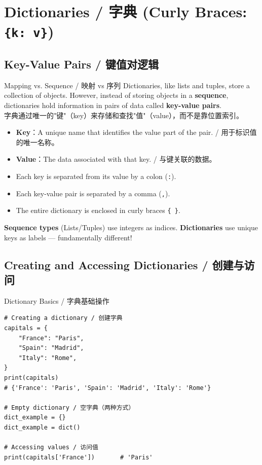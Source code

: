 \documentclass[11pt,a4paper]{article}
\begin{document}
\section{Dictionaries / 字典 (Curly Braces: \texttt{\{k: v\}})}

\subsection{Key-Value Pairs / 键值对逻辑}

\begin{concept}{Mapping vs. Sequence / 映射 vs 序列}
    Dictionaries, like lists and tuples, store a collection of objects. However, instead of storing objects in a \textbf{sequence}, dictionaries hold information in pairs of data called \textbf{key-value pairs}. \\
    字典通过唯一的"键"（key）来存储和查找"值"（value），而不是靠位置索引。

    \begin{itemize}[itemsep=0.3em]
        \item \textbf{Key}：A unique name that identifies the value part of the pair. / 用于标识值的唯一名称。
        \item \textbf{Value}：The data associated with that key. / 与键关联的数据。
        \item Each key is separated from its value by a colon (\texttt{:}).
        \item Each key-value pair is separated by a comma (\texttt{,}).
        \item The entire dictionary is enclosed in curly braces \texttt{\{ \}}.
    \end{itemize}

    \textbf{Sequence types} (Lists/Tuples) use integers as indices. \textbf{Dictionaries} use unique keys as labels — fundamentally different!
\end{concept}

\subsection{Creating and Accessing Dictionaries / 创建与访问}

\begin{examplebox}{Dictionary Basics / 字典基础操作}
\begin{lstlisting}
# Creating a dictionary / 创建字典
capitals = {
    "France": "Paris",
    "Spain": "Madrid",
    "Italy": "Rome",
}
print(capitals)
# {'France': 'Paris', 'Spain': 'Madrid', 'Italy': 'Rome'}

# Empty dictionary / 空字典（两种方式）
dict_example = {}
dict_example = dict()

# Accessing values / 访问值
print(capitals['France'])       # 'Paris'
\end{lstlisting}
\end{examplebox}
\end{document}
